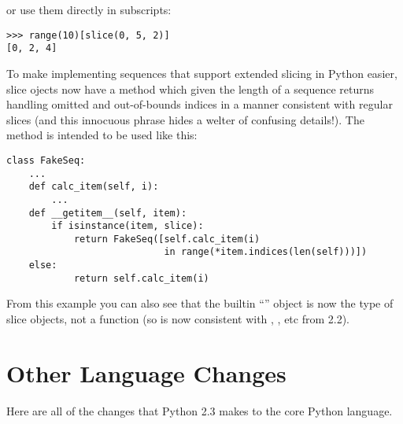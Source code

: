\documentclass{howto}
\begin{document}
or use them directly in subscripts:

\begin{verbatim}
>>> range(10)[slice(0, 5, 2)]
[0, 2, 4]
\end{verbatim}

To make implementing sequences that support extended slicing in Python
easier, slice ojects now have a method  which given
the length of a sequence returns  handling
omitted and out-of-bounds indices in a manner consistent with regular
slices (and this innocuous phrase hides a welter of confusing
details!).  The method is intended to be used like this:

\begin{verbatim}
class FakeSeq:
    ...
    def calc_item(self, i):
        ...
    def __getitem__(self, item):
        if isinstance(item, slice):
            return FakeSeq([self.calc_item(i) 
                            in range(*item.indices(len(self)))])
	else:
            return self.calc_item(i)
\end{verbatim}

From this example you can also see that the builtin ``''
object is now the type of slice objects, not a function (so is now
consistent with , , etc from 2.2).

\section{Other Language Changes}

Here are all of the changes that Python 2.3 makes to the core Python
language.
\end{document}
